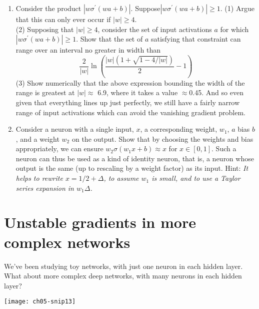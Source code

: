 \begin{enumerate}
\item Consider the product $\left|w \sigma^{\prime}(w a+b)\right|$. Suppose$\left|w \sigma^{\prime}(w a+b)\right| \geq 1$. 
(1) Argue that this can only ever occur if $|w| \geq 4$. \\
(2) Supposing that $|w| \geq 4$, consider the set of input activations $a$ for which $\left|w \sigma^{\prime}(w a+b)\right| \geq 1$. Show that the set of $a$ satisfying that constraint can range over an interval no greater in width than 
\begin{equation}
\frac{2}{|w|} \ln \left(\frac{|w|(1+\sqrt{1-4 /|w|})}{2}-1\right)
\label{eq:c05-123}
\end{equation}
(3) Show numerically that the above expression bounding the width of the range is greatest at $|w| \approx$ 6.9, where it takes a value $\approx$0.45. And so even given that everything lines up just perfectly, we still have a fairly narrow range of input activations which can avoid the vanishing gradient problem.
    
\item {}\label{page:Identityneuron} Consider a neuron with a single input, $x$, a corresponding weight, $w_1$, $a$ bias $b$, and a weight $w_2$ on the output. Show that by choosing the weights and bias appropriately, we can ensure $w_{2} \sigma\left(w_{1} x+b\right) \approx x$ for $x \in[0,1]$. Such a neuron can thus be used as a kind of identity neuron, that is, a neuron whose output is the same (up to rescaling by a weight factor) as its input. Hint: \textit{It helps to rewrite $x=1 / 2+\Delta$, to assume $w_1$ is small, and to use a Taylor series expansion in $w_1\Delta$.}

\end{enumerate}



\section{Unstable gradients in more complex networks}

We've been studying toy networks, with just one neuron in each hidden layer. What about more complex deep networks, with many neurons in each hidden layer?
\begin{figure*}[tph]
\texttt{[image: ch05-snip13]}
\label{fig:ch05-snip13}
\end{figure*}

